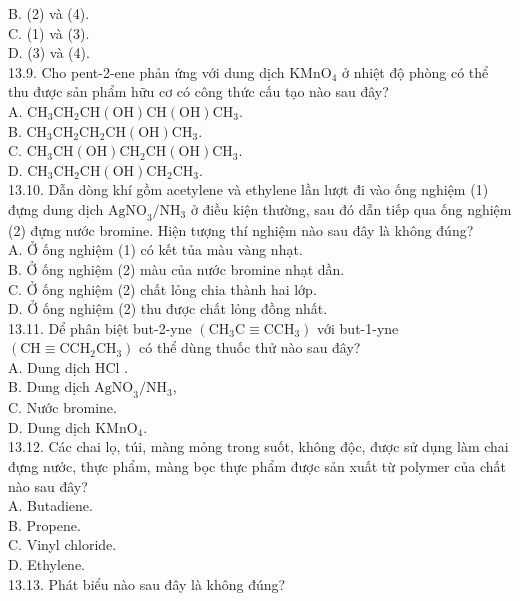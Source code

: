 \documentclass[10pt]{article}
\begin{document}
B. (2) và (4).\\
C. (1) và (3).\\
D. (3) và (4).\\
13.9. Cho pent-2-ene phản ứng với dung dịch $\mathrm{KMnO}_{4}$ ở nhiệt độ phòng có thể thu được sản phẩm hữu cơ có công thức cấu tạo nào sau đây?\\
A. $\mathrm{CH}_{3} \mathrm{CH}_{2} \mathrm{CH}(\mathrm{OH}) \mathrm{CH}(\mathrm{OH}) \mathrm{CH}_{3}$.\\
B. $\mathrm{CH}_{3} \mathrm{CH}_{2} \mathrm{CH}_{2} \mathrm{CH}(\mathrm{OH}) \mathrm{CH}_{3}$.\\
C. $\mathrm{CH}_{3} \mathrm{CH}(\mathrm{OH}) \mathrm{CH}_{2} \mathrm{CH}(\mathrm{OH}) \mathrm{CH}_{3}$.\\
D. $\mathrm{CH}_{3} \mathrm{CH}_{2} \mathrm{CH}(\mathrm{OH}) \mathrm{CH}_{2} \mathrm{CH}_{3}$.\\
13.10. Dẫn dòng khí gồm acetylene và ethylene lần lượt đi vào ống nghiệm (1) đựng dung dịch $\mathrm{AgNO}_{3} / \mathrm{NH}_{3}$ ở điều kiện thường, sau đó dẫn tiếp qua ống nghiệm (2) đựng nước bromine. Hiện tượng thí nghiệm nào sau đây là không đúng?\\
A. Ở ống nghiệm (1) có kết tủa màu vàng nhạt.\\
B. Ở ống nghiệm (2) màu của nước bromine nhạt dần.\\
C. Ở ống nghiệm (2) chất lỏng chia thành hai lớp.\\
D. Ở ống nghiệm (2) thu được chất lỏng đồng nhất.\\
13.11. Dể phân biệt but-2-yne $\left(\mathrm{CH}_{3} \mathrm{C} \equiv \mathrm{CCH}_{3}\right)$ với but-1-yne $\left(\mathrm{CH} \equiv \mathrm{CCH}_{2} \mathrm{CH}_{3}\right)$ có thể dùng thuốc thử nào sau đây?\\
A. Dung dịch HCl .\\
B. Dung dịch $\mathrm{AgNO}_{3} / \mathrm{NH}_{3}$,\\
C. Nước bromine.\\
D. Dung dịch $\mathrm{KMnO}_{4}$.\\
13.12. Các chai lọ, túi, màng mỏng trong suốt, không độc, được sử dụng làm chai đựng nước, thực phẩm, màng bọc thực phẩm được sản xuất từ polymer của chất nào sau đây?\\
A. Butadiene.\\
B. Propene.\\
C. Vinyl chloride.\\
D. Ethylene.\\
13.13. Phát biểu nào sau đây là không đúng?\\
\end{document}
